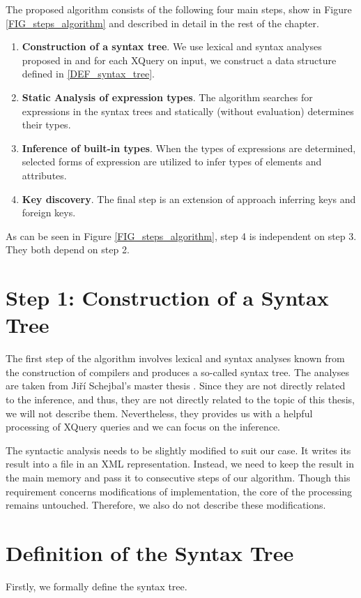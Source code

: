 The proposed algorithm consists of the following four main steps, show in Figure \ref{FIG_steps_algorithm} and described in detail in the rest of the chapter.

\begin{enumerate}
\item \textbf{Construction of a syntax tree}. We use lexical and syntax analyses proposed in \cite{thesis_schejbal} and for each XQuery on input, we construct a data structure defined in \ref{DEF_syntax_tree}.
\item \textbf{Static Analysis of expression types}. The algorithm searches for expressions in the syntax trees and statically (without evaluation) determines their types.
\item \textbf{Inference of built-in types}. When the types of expressions are determined, selected forms of expression are utilized to infer types of elements and attributes.
\item \textbf{Key discovery}. The final step is an extension of approach \cite{Necasky:2009:DXK:1529282.1529414} inferring keys and foreign keys.
\end{enumerate}

As can be seen in Figure \ref{FIG_steps_algorithm}, step 4 is independent on step 3. They both depend on step 2.

\section{Step 1: Construction of a Syntax Tree}
The first step of the algorithm involves lexical and syntax analyses known from the construction of compilers and produces a so-called syntax tree. The analyses are taken from Ji\v r\'{i} Schejbal's master thesis \cite{thesis_schejbal}. Since they are not directly related to the inference, and thus, they are not directly related to the topic of this thesis, we will not describe them. Nevertheless, they provides us with a helpful processing of XQuery queries and we can focus on the inference.

The syntactic analysis needs to be slightly modified to suit our case. It writes its result into a file in an XML representation. Instead, we need to keep the result in the main memory and pass it to consecutive steps of our algorithm. Though this requirement concerns modifications of implementation, the core of the processing remains untouched. Therefore, we also do not describe these modifications.

\section{Definition of the Syntax Tree}
Firstly, we formally define the syntax tree.

